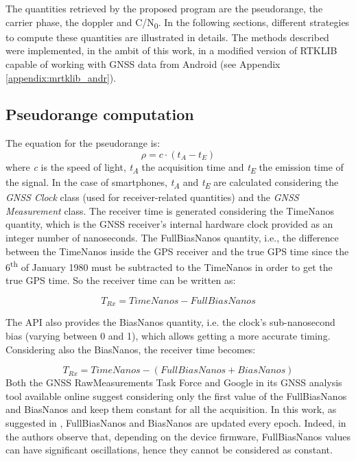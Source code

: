 The quantities retrieved by the proposed program are the pseudorange, the carrier phase, the doppler and C/N\textsubscript{0}. In the following sections, different strategies to compute these quantities are illustrated in details. The methods described were implemented, in the ambit of this work, in a modified version of RTKLIB capable of working with GNSS data from Android (see Appendix \ref{appendix:mrtklib_andr}).
\subsection{Pseudorange computation}  
The equation for the pseudorange is:
\begin{equation}
	\rho = c \cdot (t_{A}-t_{E})
	\label{eq:psrange}
\end{equation}
where \textit{c} is the speed of light, \textit{t\textsubscript{A}} the acquisition time and \textit{t\textsubscript{E}} the emission time of the signal. In the case of smartphones,  \textit{t\textsubscript{A}} and  \textit{t\textsubscript{E}} are calculated considering the \textit{GNSS Clock} class (used for receiver-related quantities) and the  \textit{GNSS Measurement} class. 
The receiver time is generated considering the TimeNanos quantity, which is the GNSS receiver’s internal hardware clock provided as an integer number of nanoseconds. The FullBiasNanos quantity, i.e., the difference between the TimeNanos inside the GPS receiver and the true GPS time since the 6\textsuperscript{th} of January 1980 must be subtracted to the TimeNanos in order to get the true GPS time. So the receiver time can be written as:

\begin{equation}
	T_{Rx} = TimeNanos - FullBiasNanos
	\label{eq:Trx_int}
\end{equation}

The API also provides the BiasNanos quantity, i.e. the clock’s sub-nanosecond bias (varying between 0 and 1), which allows getting a more accurate timing. Considering also the BiasNanos, the receiver time becomes:

\begin{equation}
	T_{Rx} = TimeNanos - (FullBiasNanos + BiasNanos)
	\label{eq:Trx_flt}
\end{equation}
Both the GNSS RawMeasurements Task Force \cite{GSA_wp:2016} and Google in its GNSS analysis tool available online suggest considering only the first value of the FullBiasNanos and BiasNanos and keep them constant for all the acquisition. In this work, as suggested in \cite{darugna2021}, FullBiasNanos and BiasNanos are updated every epoch. Indeed, in \cite{darugna2021} the authors observe that, depending on the device firmware, FullBiasNanos values can have significant oscillations, hence they cannot be considered as constant.


